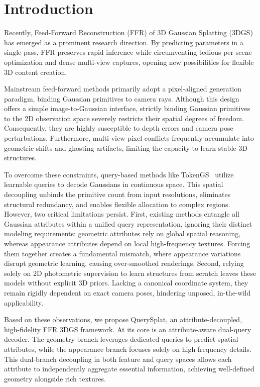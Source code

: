 \documentclass[letterpaper]{article} %
\begin{document}
\section{Introduction}
Recently, Feed-Forward Reconstruction (FFR) of 3D Gaussian Splatting (3DGS) \cite{jiang2025anysplat,ye2025yonosplat,ren2026tokengs,mescheder2025sharp} has emerged as a prominent research direction. By predicting parameters in a single pass, FFR preserves rapid inference while circumventing tedious per-scene optimization and dense multi-view captures, opening new possibilities for flexible 3D content creation.

Mainstream feed-forward methods primarily adopt a pixel-aligned generation paradigm, binding Gaussian primitives to camera rays. Although this design offers a simple image-to-Gaussian interface, strictly binding Gaussian primitives to the 2D observation space severely restricts their spatial degrees of freedom. Consequently, they are highly susceptible to depth errors and camera pose perturbations. Furthermore, multi-view pixel conflicts frequently accumulate into geometric shifts and ghosting artifacts, limiting the capacity to learn stable 3D structures. 

To overcome these constraints, query-based methods like TokenGS~\cite{ren2026tokengs} utilize learnable queries to decode Gaussians in continuous space. This spatial decoupling unbinds the primitive count from input resolutions, eliminates structural redundancy, and enables flexible allocation to complex regions. However, two critical limitations persist. First, existing methods entangle all Gaussian attributes within a unified query representation, ignoring their distinct modeling requirements: geometric attributes rely on global spatial reasoning, whereas appearance attributes depend on local high-frequency textures. Forcing them together creates a fundamental mismatch, where appearance variations disrupt geometric learning, causing over-smoothed renderings. Second, relying solely on 2D photometric supervision to learn structures from scratch leaves these models without explicit 3D priors. Lacking a canonical coordinate system, they remain rigidly dependent on exact camera poses, hindering unposed, in-the-wild applicability.

Based on these observations, we propose QuerySplat, an attribute-decoupled, high-fidelity FFR 3DGS framework. At its core is an attribute-aware dual-query decoder. The geometry branch leverages dedicated queries to predict spatial attributes, while the appearance branch focuses solely on high-frequency details. This dual-branch decoupling in both feature and query spaces allows each attribute to independently aggregate essential information, achieving well-defined geometry alongside rich textures.
\end{document}
